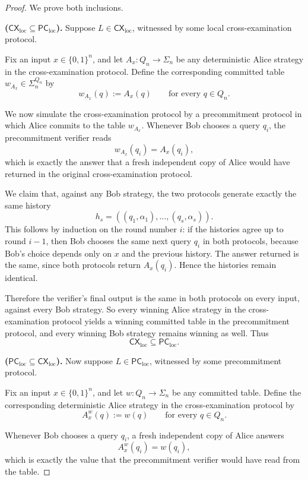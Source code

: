 \documentclass[11pt]{article}
\begin{document}
\begin{proof}
We prove both inclusions.

\medskip

\noindent\textbf{(\(\mathsf{CX}_{\mathrm{loc}} \subseteq \mathsf{PC}_{\mathrm{loc}}\)).}
Suppose \(L\in \mathsf{CX}_{\mathrm{loc}}\), witnessed by some local cross-examination
protocol.

Fix an input \(x\in\{0,1\}^n\), and let \(A_x:Q_n\to\Sigma_n\) be any deterministic
Alice strategy in the cross-examination protocol. Define the corresponding committed
table \(w_{A_x}\in \Sigma_n^{Q_n}\) by
\[
w_{A_x}(q) := A_x(q)
\qquad\text{for every } q\in Q_n.
\]

We now simulate the cross-examination protocol by a precommitment protocol in which
Alice commits to the table \(w_{A_x}\). Whenever Bob chooses a query \(q_i\), the
precommitment verifier reads
\[
w_{A_x}(q_i)=A_x(q_i),
\]
which is exactly the answer that a fresh independent copy of Alice would have returned
in the original cross-examination protocol.

We claim that, against any Bob strategy, the two protocols generate exactly the same
history
\[
h_s=((q_1,\alpha_1),\dots,(q_s,\alpha_s)).
\]
This follows by induction on the round number \(i\): if the histories agree up to round
\(i-1\), then Bob chooses the same next query \(q_i\) in both protocols, because Bob's
choice depends only on \(x\) and the previous history. The answer returned is the same,
since both protocols return \(A_x(q_i)\). Hence the histories remain identical.

Therefore the verifier's final output is the same in both protocols on every input,
against every Bob strategy. So every winning Alice strategy in the cross-examination
protocol yields a winning committed table in the precommitment protocol, and every
winning Bob strategy remains winning as well. Thus
\[
\mathsf{CX}_{\mathrm{loc}} \subseteq \mathsf{PC}_{\mathrm{loc}}.
\]

\medskip

\noindent\textbf{(\(\mathsf{PC}_{\mathrm{loc}} \subseteq \mathsf{CX}_{\mathrm{loc}}\)).}
Now suppose \(L\in \mathsf{PC}_{\mathrm{loc}}\), witnessed by some precommitment
protocol.

Fix an input \(x\in\{0,1\}^n\), and let \(w:Q_n\to\Sigma_n\) be any committed table.
Define the corresponding deterministic Alice strategy in the cross-examination protocol by
\[
A_x^w(q) := w(q)
\qquad\text{for every } q\in Q_n.
\]

Whenever Bob chooses a query \(q_i\), a fresh independent copy of Alice answers
\[
A_x^w(q_i)=w(q_i),
\]
which is exactly the value that the precommitment verifier would have read from the
table.


\end{proof}
\end{document}
